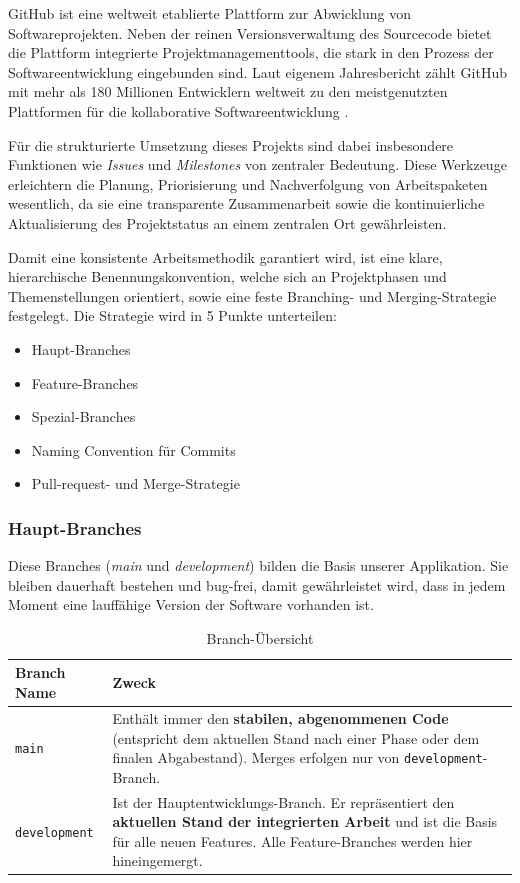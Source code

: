 
GitHub ist eine weltweit etablierte Plattform zur Abwicklung von Softwareprojekten. Neben der reinen Versionsverwaltung des Sourcecode bietet die Plattform integrierte Projektmanagementtools, die stark in den Prozess der Softwareentwicklung eingebunden sind. Laut eigenem Jahresbericht \cite{github2025octoverse} zählt GitHub mit mehr als 180 Millionen Entwicklern weltweit zu den meistgenutzten Plattformen für die kollaborative Softwareentwicklung \cite{stackoverflow2025survey}. 

Für die strukturierte Umsetzung dieses Projekts sind dabei insbesondere Funktionen wie \textit{Issues} und \textit{Milestones} von zentraler Bedeutung. Diese Werkzeuge erleichtern die Planung, Priorisierung und Nachverfolgung von Arbeitspaketen wesentlich, da sie eine transparente Zusammenarbeit sowie die kontinuierliche Aktualisierung des Projektstatus an einem zentralen Ort gewährleisten.

Damit eine konsistente Arbeitsmethodik garantiert wird, ist eine klare, hierarchische Benennungskonvention, welche sich an Projektphasen und Themenstellungen orientiert, sowie eine feste Branching-\cite{git_branching_workflow_chacon2014progit} und Merging-Strategie festgelegt.
Die Strategie wird in 5 Punkte unterteilen:
\begin{itemize}
    \item Haupt-Branches
    \item Feature-Branches
    \item Spezial-Branches
    \item Naming Convention für Commits
    \item Pull-request- und Merge-Strategie
\end{itemize}
\subsubsection{Haupt-Branches}
Diese Branches (\textit{main} und \textit{development}) bilden die Basis unserer Applikation. Sie bleiben dauerhaft bestehen und bug-frei, damit gewährleistet wird, dass in jedem Moment eine lauffähige Version der Software vorhanden ist. 
\begin{table}[h]
\centering
\begin{tabular}{|p{}|p{}|}
\hline
\textbf{Branch Name} & \textbf{Zweck} \\
\hline
\texttt{main} &
Enthält immer den \textbf{stabilen, abgenommenen Code}
(entspricht dem aktuellen Stand nach einer Phase oder dem
finalen Abgabestand). Merges erfolgen nur von
\texttt{development}-Branch. \\
\hline
\texttt{development} &
Ist der Hauptentwicklungs-Branch. Er repräsentiert den
\textbf{aktuellen Stand der integrierten Arbeit} und ist
die Basis für alle neuen Features. Alle Feature-Branches
werden hier hineingemergt. \\
\hline
\end{tabular}
\caption{Branch-Übersicht}
\label{tab:branches}
\end{table}

